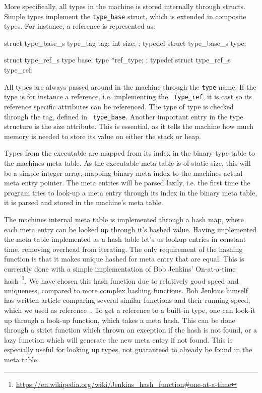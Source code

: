 More specifically, all types in the machine is stored internally through
structs. Simple types implement the {\tt type\_base} struct, which is extended
in composite types. For instance, a reference is represented as:
\begin{ccode}
struct type_base_s {
    type_tag tag;
    int size;
};
typedef struct type_base_s type;

struct type_ref_s {
    type base;
    type *ref_type;
};
typedef struct type_ref_s type_ref;
\end{ccode}

All types are always passed around in the machine through the {\tt type}
name. If the type is for instance a reference, i.e. implementing the {\tt
  type\_ref}, it is cast so its reference specific attributes can be
referenced. The type of type is checked through the tag, defined in {\tt
  type\_base}. Another important entry in the type structure is the size
attribute. This is essential, as it tells the machine how much memory is needed
to store its value on either the stack or heap.

Types from the executable are mapped from its index in the binary type table to
the machines meta table. As the executable meta table is of static size, this
will be a simple integer array, mapping binary meta index to the machines actual
meta entry pointer. The meta entries will be parsed lazily, i.e. the first time
the program tries to look-up a meta entry through its index in the binary meta
table, it is parsed and stored in the machine's meta table.

The machines internal meta table is implemented through a hash map, where each
meta entry can be looked up through it's hashed value. Having implemented the
meta table implemented as a hash table let's us lookup entries in constant time,
removing overhead from iterating. The only requirement of the hashing function
is that it makes unique hashed for meta entry that are equal. This is currently
done with a simple implementation of Bob Jenkins' On-at-a-time
hash~\footnote{\url{https://en.wikipedia.org/wiki/Jenkins_hash_function\#one-at-a-time}}. We
have chosen this hash function due to relatively good speed and uniqueness,
compared to more complex hashing functions. Bob Jenkins himself has written
article comparing several similar functions and their running speed, which we
used as reference~\cite{jenkins}. To get a reference to a built-in type, one can
look-it up through a look-up function, which takes a meta hash. This can be done
through a strict function which thrown an exception if the hash is not found, or
a lazy function which will generate the new meta entry if not found. This is
especially useful for looking up types, not guaranteed to already be found in
the meta table.

